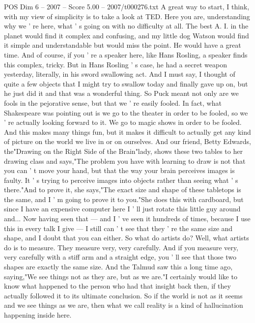 \begin{textsample}{POS Dim 6 – 2007 – Score 5.00 – 2007/t000276.txt}  \label{ex:f6_pos_019}
A great way to start, I think, with my view of simplicity is to take a look at TED.
Here you are, understanding why we ' re here, what ' s going on with no difficulty at all.
The best A.
I. in the planet would find it complex and confusing, and my little dog Watson would find it simple and understandable but would miss the point.
He would have a great time.
And of course, if you ' re a speaker here, like Hans Rosling, a speaker finds this complex, tricky.
But in Hans Rosling ' s case, he had a secret weapon yesterday, literally, in his sword swallowing act.
And I must say, I thought of quite a few objects that I might try to swallow today and finally gave up on, but he just did it and that was a wonderful thing.
So Puck meant not only are we fools in the pejorative sense, but that we ' re easily fooled.
In fact, what Shakespeare was pointing out is we go to the theater in order to be fooled, so we ' re actually looking forward to it.
We go to magic shows in order to be fooled.
And this makes many things fun, but it makes it difficult to actually get any kind of picture on the world we live in or on ourselves.
And our friend, Betty Edwards, the"Drawing on the Right Side of the Brain"lady, shows these two tables to her drawing class and says,"The problem you have with learning to draw is not that you can ' t move your hand, but that the way your brain perceives images is faulty.
It ' s trying to perceive images into objects rather than seeing what ' s there."And to prove it, she says,"The exact size and shape of these tabletops is the same, and I ' m going to prove it to you."She does this with cardboard, but since I have an expensive computer here I ' ll just rotate this little guy around and...
Now having seen that — and I ' ve seen it hundreds of times, because I use this in every talk I give — I still can ' t see that they ' re the same size and shape, and I doubt that you can either.
So what do artists do?
Well, what artists do is to measure.
They measure very, very carefully.
And if you measure very, very carefully with a stiff arm and a straight edge, you ' ll see that those two shapes are exactly the same size.
And the Talmud saw this a long time ago, saying,"We see things not as they are, but as we are."I certainly would like to know what happened to the person who had that insight back then, if they actually followed it to its ultimate conclusion.
So if the world is not as it seems and we see things as we are, then what we call reality is a kind of hallucination happening inside here.

\end{textsample}
